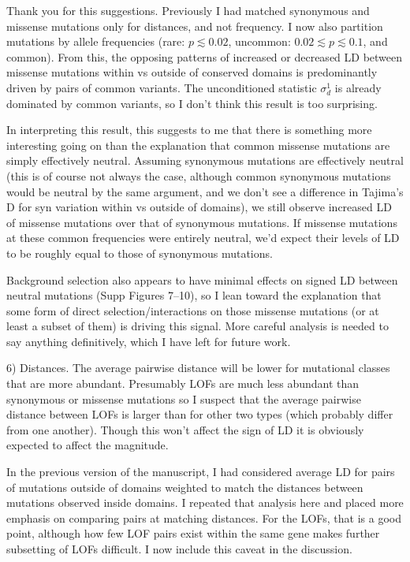 \documentclass{article}
\newenvironment{response}%
  {\list{}{\leftmargin=0.5in\rightmargin=0.5in\color{blue}}\item[]}%
  {\endlist}
\begin{document}
\begin{response}
    Thank you for this suggestions.
    Previously I had matched synonymous and missense mutations only for distances,
    and not frequency. I now also partition mutations by allele frequencies
    (rare: $p\lesssim 0.02$, uncommon: $0.02\lesssim p \lesssim 0.1$, and common).
    From this, the opposing patterns of increased or decreased LD between missense
    mutations within vs outside of conserved domains is predominantly driven by
    pairs of common variants. The unconditioned statistic \(\sigma_d^1\) is
    already dominated by common variants, so I don't think this result is too
    surprising.

    In interpreting this result, this suggests to me that there is something
    more interesting going on than the explanation that common missense
    mutations are simply effectively neutral. Assuming synonymous mutations are
    effectively neutral (this is of course not always the case, although common
    synonymous mutations would be neutral by the same argument, and we don't
    see a difference in Tajima's D for syn variation within vs outside of domains),
    we still observe increased LD of missense mutations over that of synonymous
    mutations. If missense mutations at these common frequencies were entirely
    neutral, we'd expect their levels of LD
    to be roughly equal to those of synonymous mutations.

    Background selection also appears to have minimal effects on signed LD between
    neutral mutations (Supp Figures 7--10), so I lean toward the explanation that
    some form of direct selection/interactions on those missense mutations (or at
    least a subset of them) is driving this signal. More careful analysis is needed
    to say anything definitively, which I have left for future work.
\end{response}

6) Distances. The average pairwise distance will be lower for mutational
classes that are more abundant. Presumably LOFs are much less abundant than
synonymous or missense mutations so I suspect that the average pairwise
distance between LOFs is larger than for other two types (which probably differ
from one another). Though this won't affect the sign of LD it is obviously
expected to affect the magnitude.

\begin{response}
    In the previous version of the manuscript, I had considered average LD for
    pairs of mutations outside of domains weighted to match the distances between
    mutations observed inside domains. I repeated that analysis here and placed
    more emphasis on comparing pairs at matching distances. For the LOFs, that
    is a good point, although how few LOF pairs exist within the same gene makes
    further subsetting of LOFs difficult. I now include this caveat in the discussion.
\end{response}
\end{document}
